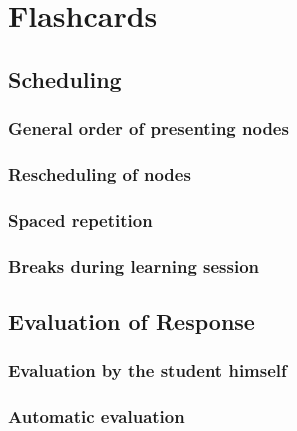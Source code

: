 \chapter{Flashcards}

\section{Scheduling}

\subsection{General order of presenting nodes}

\subsection{Rescheduling of nodes}

\subsection{Spaced repetition}

\subsection{Breaks during learning session}

\section{Evaluation of Response}

\subsection{Evaluation by the student himself}

\subsection{Automatic evaluation}
